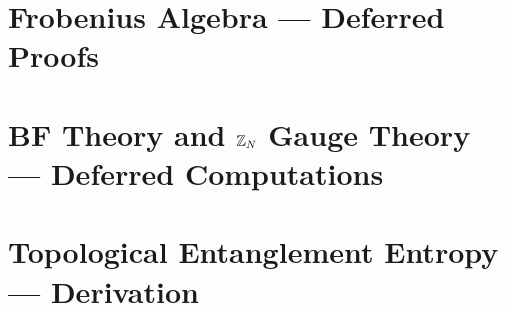 \documentclass[11pt]{report}
\begin{document}
\chapter{Frobenius Algebra --- Deferred Proofs}




\chapter{BF Theory and $\mathbb{Z}_N$ Gauge Theory --- Deferred Computations}


\chapter{Topological Entanglement Entropy --- Derivation}




\end{document}

